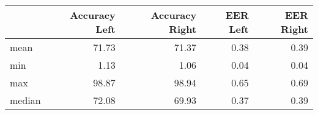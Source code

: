 \begin{tabular}{lrrrr}
\toprule
{} &  Accuracy Left &  Accuracy Right &  EER Left &  EER Right \\
\midrule
mean   &          71.73 &           71.37 &      0.38 &       0.39 \\
min    &           1.13 &            1.06 &      0.04 &       0.04 \\
max    &          98.87 &           98.94 &      0.65 &       0.69 \\
median &          72.08 &           69.93 &      0.37 &       0.39 \\
\bottomrule
\end{tabular}

